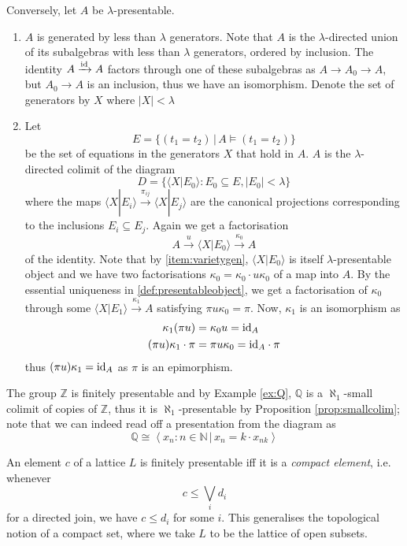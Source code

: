 Conversely, let $A$ be $\lambda$-presentable.
\begin{enumerate}
\item \label{item:varietygen} $A$ is generated by less than $\lambda$ generators. Note that $A$ is the $\lambda$-directed union of its subalgebras with less than $\lambda$ generators, ordered by inclusion. The identity $A \xrightarrow{\textrm{id}} A$ factors through one of these subalgebras as $A \to A_0 \to A$, but $A_0 \to A$ is an inclusion, thus we have an isomorphism. Denote the set of generators by $X$ where $|X| < \lambda$
\item Let \[ E = \{ (t_1 = t_2) \,|\, A \models (t_1 = t_2) \} \] be the set of equations in the generators $X$ that hold in $A$. $A$ is the $\lambda$-directed colimit of the diagram
\[ D = \{ \langle X|E_0\rangle : E_0 \subseteq E, |E_0| < \lambda \} \]
where the maps $\langle X|E_i\rangle \xrightarrow{\pi_{ij}} \langle X|E_j\rangle$ are the canonical projections corresponding to the inclusions $E_i \subseteq E_j$. Again we get a factorisation 
\[ A \xrightarrow{u} \langle X|E_0 \rangle \xrightarrow{\kappa_0} A \]
of the identity. Note that by \ref{item:varietygen}, $\langle X|E_0 \rangle$ is itself $\lambda$-presentable object and we have two factorisations $\kappa_0 = \kappa_0 \cdot u\kappa_0$ of a map into $A$. By the essential uniqueness in \ref{def:presentableobject}, we get a factorisation of $\kappa_0$ through some $\langle X|E_1 \rangle \xrightarrow{\kappa_1} A$ satisfying $\pi u \kappa_0 = \pi$. Now, $\kappa_1$ is an isomorphism as
\begin{align*}
\kappa_1 (\pi u) &= \kappa_0 u = \textrm{id}_A \\
(\pi u) \kappa_1 \cdot \pi &= \pi u \kappa_0 = \textrm{id}_A \cdot \pi
\end{align*}
thus $(\pi u) \kappa_1 = \textrm{id}_A$ as $\pi$ is an epimorphism.
\end{enumerate}

\begin{Example}
The group $\mathbb Z$ is finitely presentable and by Example \ref{ex:Q}, $\mathbb Q$ is a $\aleph_1$-small colimit of copies of $\mathbb Z$, thus it is $\aleph_1$-presentable by Proposition \ref{prop:smallcolim}; note that we can indeed read off a presentation from the diagram as
\[ \mathbb Q \cong \left\langle x_n : n \in \mathbb N\,|\,x_n = k \cdot x_{nk} \right \rangle\]
\end{Example}

\begin{Example}
An element $c$ of a lattice $L$ is finitely presentable iff it is a \emph{compact element}, i.e. whenever
\[ c \leq \bigvee_i d_i \]
for a directed join, we have $c \leq d_i$ for some $i$. This generalises the topological notion of a compact set, where we take $L$ to be the lattice of open subsets.
\end{Example}


